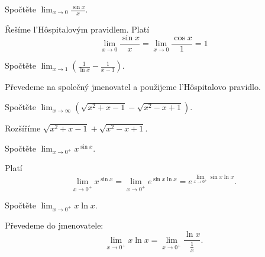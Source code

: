 \begin{priklad}
  Spočtěte $\lim_{x\to 0}\frac{\sin x}{x}.$
\end{priklad}

\begin{reseni}
  Řešíme l'H\^ospitalovým pravidlem.
  Platí
  $$\lim_{x\to 0}\frac{\sin x}{x}=\lim_{x\to 0}\frac{\cos x}{1}=1$$
\end{reseni}


\begin{priklad}
Spočtěte $\lim_{x\to 1} \left ( \frac{1}{\ln x}-\frac{1}{x-1} \right ) $.
\end{priklad}

\begin{reseni}
Převedeme na společný jmenovatel a použijeme l'H\^{o}spitalovo pravidlo.
\end{reseni}

\begin{priklad}
Spočtěte $\lim_{x\to \infty}\left ( \sqrt{x^2+x-1}-\sqrt{x^2-x+1}   \right ) $.
\end{priklad}

\begin{reseni}
Rozšíříme $\sqrt{x^2+x-1}+\sqrt{x^2-x+1}$.
\end{reseni}

\begin{priklad}
Spočtěte $\lim_{x\to 0^+}x^{\sin x}.$
\end{priklad}

\begin{reseni}
Platí
$$\lim_{x\to 0^+}x^{\sin x}=\lim_{x\to 0^+}e^{\sin x\ln x}=e^{\lim_{x\to 0^+}\sin x\ln x}.$$
\end{reseni}

\begin{priklad}
  Spočtěte $\lim_{x\to 0^+}x\ln x.$
\end{priklad}

\begin{reseni}
  Převedeme do jmenovatele:
  $$\lim_{x\to 0^+}x\ln x=\lim_{x\to 0^+}\frac{\ln x}{\frac{1}{x}}.$$
\end{reseni}
